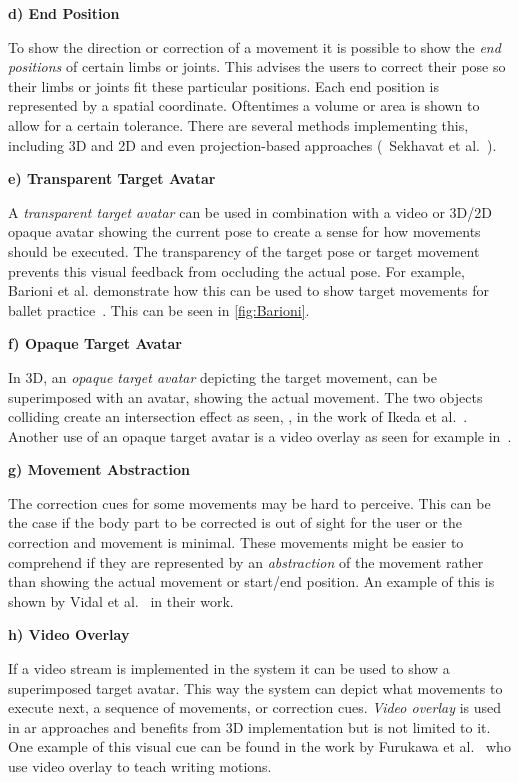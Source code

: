 \textbf{d) End Position}

To show the direction or correction of a movement it is possible to show the \textit{end positions} of certain limbs or joints. This advises the users to correct their pose so their limbs or joints fit these particular positions. Each end position is represented by a spatial coordinate. Oftentimes a volume or area is shown to allow for a certain tolerance. There are several methods implementing this, including 3D and 2D and even projection-based approaches (\eg\ Sekhavat et al.~\cite{sekhavat2018pba}).

\textbf{e) Transparent Target Avatar}

A \textit{transparent target avatar} can be used in combination with a video or 3D/2D opaque avatar showing the current pose to create a sense for how movements should be executed. The transparency of the target pose or target movement prevents this visual feedback from occluding the actual pose. For example, Barioni et al. demonstrate how this can be used to show target movements for ballet practice~\cite{barioni2019bvr}. This can be seen in \autoref{fig:Barioni}.

\textbf{f) Opaque Target Avatar}

In 3D, an \emph{opaque target avatar} depicting the target movement, can be superimposed with an avatar, showing the actual movement. The two objects colliding create an intersection effect as seen, \eg, in the work of Ikeda et al.~\cite{ikeda2018arb}. Another use of an opaque target avatar is a video overlay as seen for example in~\cite{kosmalla2017cvi}.

\textbf{g) Movement Abstraction}

The correction cues for some movements may be hard to perceive. This can be the case if the body part to be corrected is out of sight for the user or the correction and movement is minimal. These movements might be easier to comprehend if they are represented by an \textit{abstraction} of the movement rather than showing the actual movement or start/end position. An example of this is shown by Vidal et al.~\cite{vidal2020blo} in their work.

\textbf{h) Video Overlay}

If a video stream is implemented in the system it can be used to show a superimposed target avatar. This way the system can depict what movements to execute next, a sequence of movements, or correction cues. \textit{Video overlay} is used in \acrshort{ar} approaches and benefits from 3D implementation but is not limited to it. One example of this visual cue can be found in the work by Furukawa et al.~\cite{furukawa2018dar} who use video overlay to teach writing motions.


